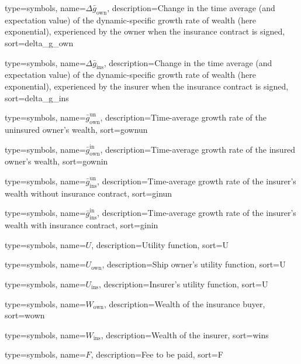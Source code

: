 {
 type={symbols}, 
 name={\ensuremath{\Delta \bar{g}_{\text{own}}}},
 description={Change in the time average (and expectation value) of the dynamic-specific growth rate of wealth (here exponential), experienced by the owner when the insurance contract is signed},
 sort=delta_g_own
}

{
 type={symbols}, 
 name={\ensuremath{\Delta \bar{g}_{\text{ins}}}},
 description={Change in the time average (and expectation value) of the dynamic-specific growth rate of wealth (here exponential), experienced by the insurer when the insurance contract is signed},
 sort=delta_g_ins
}

{
  type={symbols}, 
  name={\ensuremath{\bar{g}_{\text{own}}^{\text{un}}}},
  description={Time-average growth rate of the uninsured owner's wealth},
  sort=gownun
}

{
  type={symbols}, 
  name={\ensuremath{\bar{g}_{\text{own}}^{\text{in}}}},
  description={Time-average growth rate of the insured owner's wealth},
  sort=gownin
}


{
  type={symbols}, 
  name={\ensuremath{\bar{g}_{\text{ins}}^{\text{un}}}},
  description={Time-average growth rate of the insurer's wealth without insurance contract},
  sort=ginun
}

{
  type={symbols}, 
  name={\ensuremath{\bar{g}_{\text{ins}}^{\text{in}}}},
  description={Time-average growth rate of the insurer's wealth with insurance contract},
  sort=ginin
}

{
  type={symbols}, 
  name={\ensuremath{U}},
  description={Utility function},
  sort=U
}

{
  type={symbols}, 
  name={\ensuremath{U_{\text{own}}}},
  description={Ship owner's utility function},
  sort=U
}

{
  type={symbols}, 
  name={\ensuremath{U_{\text{ins}}}},
  description={Insurer's utility function},
  sort=U
}

{
  type={symbols}, 
  name={\ensuremath{W_{\text{own}}}},
  description={Wealth of the insurance buyer},
  sort=wown
}

{
  type={symbols}, 
  name={\ensuremath{W_{\text{ins}}}},
  description={Wealth of the insurer},
  sort=wins
}


{
  type={symbols}, 
  name={\ensuremath{F}},
  description={Fee to be paid},
  sort=F
}

